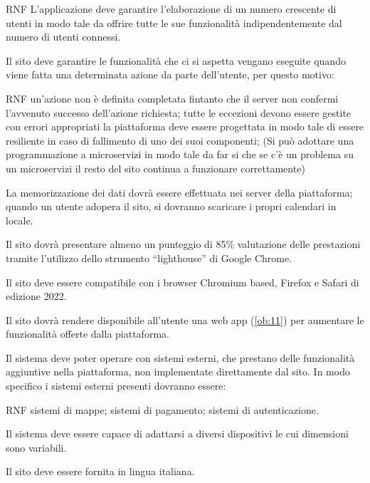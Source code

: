 \begin{listaPersonale}{RNF}
     L'applicazione deve garantire l'elaborazione di un numero crescente di utenti in modo tale da offrire tutte le sue funzionalità indipendentemente dal numero di utenti connessi.

     Il sito deve garantire le funzionalità che ci si aspetta vengano eseguite quando viene fatta una determinata azione da parte dell'utente, per questo motivo:
    \begin{listaPersonale2}{RNF}
         un'azione non è definita completata fintanto che il server non confermi l'avvenuto successo dell'azione richiesta;
         tutte le eccezioni devono essere gestite con errori appropriati
         la piattaforma deve essere progettata in modo tale di essere resiliente in caso di fallimento di uno dei suoi componenti; (Si può adottare una programmazione a microservizi in modo tale da far si che se c'è un problema su un microservizi il resto del sito continua a funzionare correttamente)
    \end{listaPersonale2}

     La memorizzazione dei dati dovrà essere effettuata nei server della piattaforma; quando un utente adopera il sito, si dovranno scaricare i propri calendari in locale.

     Il sito dovrà presentare almeno un punteggio di 85\% valutazione delle prestazioni tramite l'utilizzo dello strumento “lighthouse” di Google Chrome.

     Il sito deve essere compatibile con i browser Chromium based, Firefox e Safari di edizione 2022.

     Il sito dovrà rendere disponibile all'utente una web app (\ref{ob:11}) per aumentare le funzionalità offerte dalla piattaforma.

     Il sistema deve poter operare con sistemi esterni, che prestano delle funzionalità aggiuntive nella piattaforma, non implementate direttamente dal sito. In modo specifico i sistemi esterni presenti dovranno essere:
    \begin{listaPersonale2}{RNF}
        sistemi di mappe;
        sistemi di pagamento;
        sistemi di autenticazione.
    \end{listaPersonale2}

     Il sistema deve essere capace di adattarsi a diversi dispositivi le cui dimensioni sono variabili.

     Il sito deve essere fornita in lingua italiana.
\end{listaPersonale}